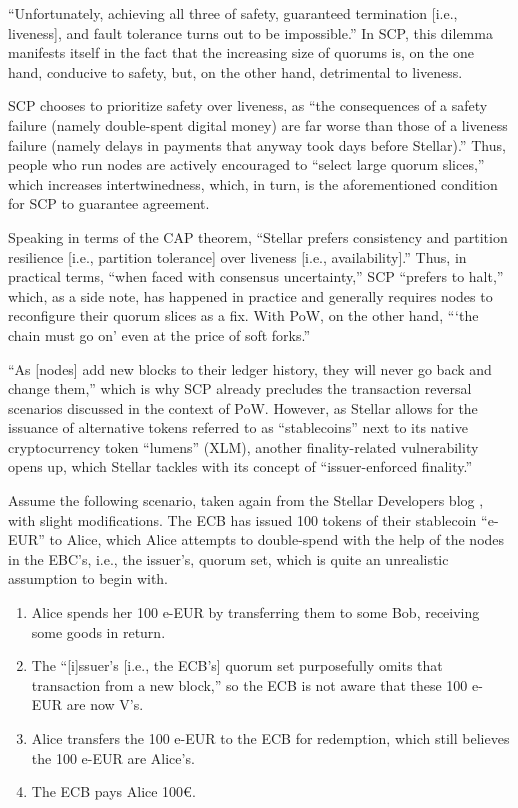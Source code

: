 ``Unfortunately, achieving all three of safety, guaranteed termination [i.e., liveness], and fault tolerance turns out to be impossible.'' \autocite{mazieres2019}
In SCP, this dilemma manifests itself in the fact that the increasing size of quorums is, on the one hand, conducive to safety, but, on the other hand, detrimental to liveness. \autocite{mazieres2019}

SCP chooses to prioritize safety over liveness, as ``the consequences of a safety failure (namely double-spent digital money) are far worse than those of a liveness failure (namely delays in payments that anyway took days before Stellar).''
Thus, people who run nodes are actively encouraged to ``select large quorum slices,'' which increases intertwinedness, which, in turn, is the aforementioned condition for SCP to guarantee agreement.

Speaking in terms of the CAP theorem, ``Stellar prefers consistency and partition resilience [i.e., partition tolerance] over liveness [i.e., availability].'' \autocite{stellar2019networkhalt}
Thus, in practical terms, ``when faced with consensus uncertainty,'' SCP ``prefers to halt,'' which, as a side note, has happened in practice and generally requires nodes to reconfigure their quorum slices as a fix. \autocite{stellar2019networkhalt}
With PoW, on the other hand, \enquote{\enquote{the chain must go on} even at the price of soft forks.} \autocite{stellar2019networkhalt}

``As [nodes] add new blocks to their ledger history, they will never go back and change them,'' which is why SCP already precludes the transaction reversal scenarios discussed in the context of PoW.
However, as Stellar allows for the issuance of alternative tokens referred to as ``stablecoins'' next to its native cryptocurrency token ``lumens'' (XLM), another finality-related vulnerability opens up, which Stellar tackles with its concept of ``issuer-enforced finality.''

Assume the following scenario, taken again from the Stellar Developers blog \autocite{stellar2020ief}, with slight modifications.
The ECB has issued 100 tokens of their stablecoin ``e-EUR'' to Alice, which Alice attempts to double-spend with the help of the nodes in the EBC's, i.e., the issuer's, quorum set, which is quite an unrealistic assumption to begin with.

\begin{enumerate}
\item
Alice spends her 100 e-EUR by transferring them to some Bob, receiving some goods in return.
\item
The ``[i]ssuer’s [i.e., the ECB's] quorum set purposefully omits that transaction from a new block,'' so the ECB is not aware that these 100 e-EUR are now V's.
\item
Alice transfers the 100 e-EUR to the ECB for redemption, which still believes the 100 e-EUR are Alice's.
\item
The ECB pays Alice 100€.
\end{enumerate}

